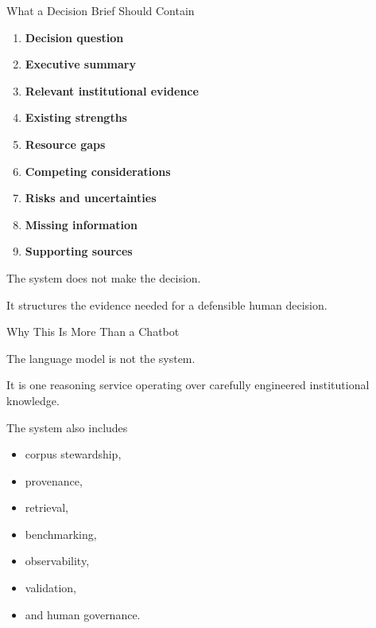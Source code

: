 \documentclass[aspectratio=169]{beamer}
\begin{document}
\begin{frame}{What a Decision Brief Should Contain}

\begin{enumerate}

\item \textbf{Decision question}

\item \textbf{Executive summary}

\item \textbf{Relevant institutional evidence}

\item \textbf{Existing strengths}

\item \textbf{Resource gaps}

\item \textbf{Competing considerations}

\item \textbf{Risks and uncertainties}

\item \textbf{Missing information}

\item \textbf{Supporting sources}

\end{enumerate}

\vspace{0.5cm}

The system does not make the decision.

It structures the evidence needed for a defensible human decision.

\end{frame}

\begin{frame}{Why This Is More Than a Chatbot}

\Large

\begin{block}{The language model is not the system.}

It is one reasoning service operating over carefully engineered
institutional knowledge.

\end{block}

\vspace{0.0cm}

The system also includes

\begin{itemize}
\item corpus stewardship,
\item provenance,
\item retrieval,
\item benchmarking,
\item observability,
\item validation,
\item and human governance.
\end{itemize}

\end{frame}
\end{document}
